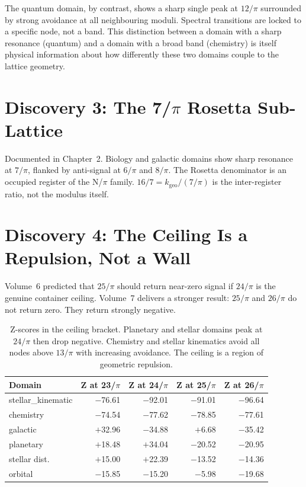 \documentclass[11pt, letterpaper, openany]{book}
\begin{document}
The quantum domain, by contrast, shows a sharp single peak at $12/\pi$ surrounded by
strong avoidance at all neighbouring moduli. Spectral transitions are locked to a
specific node, not a band. This distinction between a domain with a sharp resonance
(quantum) and a domain with a broad band (chemistry) is itself physical information
about how differently these two domains couple to the lattice geometry.

\section*{Discovery 3: The 7/$\pi$ Rosetta Sub-Lattice}

Documented in Chapter~2. Biology and galactic domains show sharp resonance at $7/\pi$,
flanked by anti-signal at $6/\pi$ and $8/\pi$. The Rosetta denominator is an occupied
register of the N/$\pi$ family. $16/7 = k_\text{geo} / (7/\pi)$ is the inter-register
ratio, not the modulus itself.

\section*{Discovery 4: The Ceiling Is a Repulsion, Not a Wall}

Volume~6 predicted that $25/\pi$ should return near-zero signal if $24/\pi$ is the
genuine container ceiling. Volume~7 delivers a stronger result: $25/\pi$ and $26/\pi$
do not return zero. They return strongly negative.

\begin{table}[H]
\centering
\renewcommand{\arraystretch}{1.3}
\begin{tabular}{|l|r|r|r|r|}
\hline
\textbf{Domain} & \textbf{Z at 23/$\pi$} & \textbf{Z at 24/$\pi$} & \textbf{Z at 25/$\pi$} & \textbf{Z at 26/$\pi$} \\
\hline\hline
stellar\_kinematic & $-$76.61 & $-$92.01 & $-$91.01 & $-$96.64 \\
chemistry          & $-$74.54 & $-$77.62 & $-$78.85 & $-$77.61 \\
galactic           & $+$32.96 & $-$34.88 & $+$6.68 & $-$35.42 \\
planetary          & $+$18.48 & $+$34.04 & $-$20.52 & $-$20.95 \\
stellar dist.      & $+$15.00 & $+$22.39 & $-$13.52 & $-$14.36 \\
orbital            & $-$15.85 & $-$15.20 & $-$5.98 & $-$19.68 \\
\hline
\end{tabular}
\caption{Z-scores in the ceiling bracket. Planetary and stellar domains peak at $24/\pi$
then drop negative. Chemistry and stellar kinematics avoid all nodes above $13/\pi$
with increasing avoidance. The ceiling is a region of geometric repulsion.}
\label{tab:ceiling_bracket}
\end{table}
\end{document}
